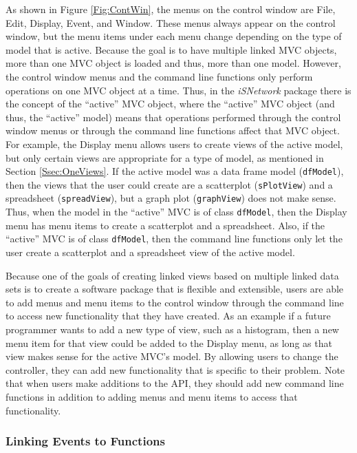 \documentclass{article}[11pt]
\newcommand{\Robject}[1]{{\texttt{#1}}}
\newcommand{\Rpackage}[1]{{\textit{#1}}}
\begin{document}
As shown in Figure \ref{Fig:ContWin}, the menus on the control window are
File, Edit, Display, Event, and Window.  These menus always appear on the
control window, but the menu items under each menu change depending on
the type of model that is active.  Because the goal is to have multiple
linked MVC objects, more than one MVC object is loaded and thus,
more than one model. However, the control window menus and the command line
functions only perform operations on one MVC object at a time.  Thus, in
the \Rpackage{iSNetwork} package there is the concept of the ``active''
MVC object, where the ``active'' MVC object (and thus, the ``active'' model)
means that operations performed through the control window menus or through
the command line functions affect that MVC object.  For
example, the Display menu allows users to create views of the active model,
but only certain views are appropriate for a type of model, as mentioned in
Section \ref{Ssec:OneViews}.  If the active model was a data frame model
(\Robject{dfModel}), then the views that the user could create are a
scatterplot (\Robject{sPlotView}) and a spreadsheet (\Robject{spreadView}),
but a graph plot (\Robject{graphView}) does not make sense.  Thus, when the
model in the ``active'' MVC is of class \Robject{dfModel}, then the Display
menu has menu items to create a scatterplot and a spreadsheet.  Also, if
the ``active'' MVC is of class \Robject{dfModel}, then the command line
functions only let the user create a scatterplot and a spreadsheet view
of the active model.

Because one of the goals of creating linked views based on multiple linked
data sets is to create a software package that is flexible and extensible,
users are able to add menus and menu items to the control window through
the command line to access new functionality that they have created.  As an
example if a future programmer wants to add a new type of view, such as a
histogram, then a new menu item for that view could be added to the Display
menu, as long as that view makes sense for the active MVC's model.  By
allowing users to change the controller, they can add new functionality that
is specific to their problem.  Note that when users make additions to the API,
they should add new command line functions in addition to adding menus and
menu items to access that functionality.

\subsubsection{Linking Events to Functions}\label{Ssec:OneEvent}
\end{document}
